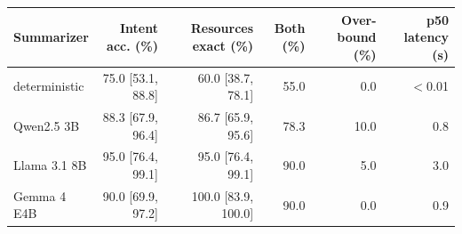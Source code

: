 \begin{tabular}{lrrrrr}
\toprule
Summarizer & Intent acc. (\%) & Resources exact (\%) & Both (\%) & Over-bound (\%) & p50 latency (s) \\
\midrule
deterministic & 75.0 {\scriptsize[53.1, 88.8]} & 60.0 {\scriptsize[38.7, 78.1]} & 55.0 & 0.0 & $<$0.01 \\
Qwen2.5 3B & 88.3 {\scriptsize[67.9, 96.4]} & 86.7 {\scriptsize[65.9, 95.6]} & 78.3 & 10.0 & 0.8 \\
Llama 3.1 8B & 95.0 {\scriptsize[76.4, 99.1]} & 95.0 {\scriptsize[76.4, 99.1]} & 90.0 & 5.0 & 3.0 \\
Gemma 4 E4B & 90.0 {\scriptsize[69.9, 97.2]} & 100.0 {\scriptsize[83.9, 100.0]} & 90.0 & 0.0 & 0.9 \\
\bottomrule
\end{tabular}

